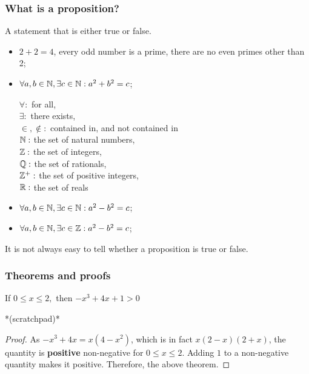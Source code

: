  \begin{frame}[fragile]\frametitle{What is a proposition?}
A statement that is either true or false.

\begin{itemize}
\item $2+2 = 4$, every odd number is a prime, there are no even primes other than 2;

\item $\forall a,b \in {{\mathbb{N}}}, \exists c \in {{\mathbb{N}}}: a^2 + b^2 = c$;



$\forall:$ for all, \\
$\exists:$ there exists, \\
$\in, \notin:$ contained in, and not contained in\\

${{\mathbb{N}}}:$ the set of natural numbers,\\
 ${{\mathbb{Z}}}:$ the set of integers,\\ 
 ${{\mathbb{Q}}}:$ the set of rationals,\\ 
 ${{\mathbb{Z^+}}}:$ the set of positive integers,\\
 ${{\mathbb{R}}}:$ the set of reals\\
 


\item $\forall a,b \in {{\mathbb{N}}}, \exists c \in {{\mathbb{N}}}: a^2 - b^2 = c$;


\item $\forall a,b \in {{\mathbb{N}}}, \exists c \in {{\mathbb{Z}}}: a^2 - b^2 = c$;
\end{itemize}

It is not always easy to tell whether a proposition is true or false. 

\end{frame}

 \begin{frame}[fragile]\frametitle{Theorems and proofs}
\begin{theorem}
If $0 \leq x \leq 2,$ then $-x^3+4x+1 > 0$
\end{theorem}

*(scratchpad)*

\begin{proof}
As $-x^3+4x = x(4-x^2)$, which is in fact $x(2-x)(2+x)$, the quantity is 
\textbf{positive} 
non-negative for $0\leq x \leq 2$.
Adding $1$ to a non-negative quantity makes it positive. Therefore, the above theorem.
\end{proof}
\end{frame}

